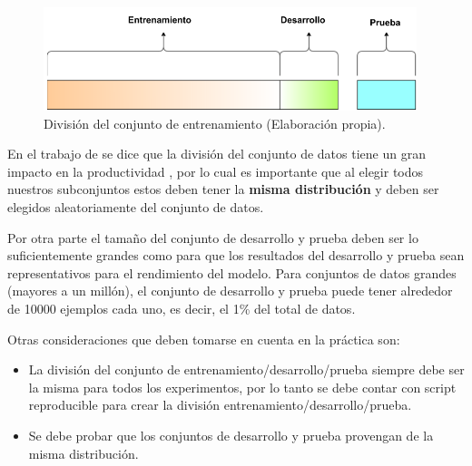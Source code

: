 \vspace{5mm} %

\begin{figure}[h!]
  \begin{center}	\includegraphics[width=0.97\textwidth,frame]{imagenes/Cap3/train-dev-test}
  \caption{Divisi\'{o}n del conjunto de entrenamiento (Elaboraci\'{o}n propia).}
  \label{fig:train-dev-test}
  \end{center}
\end{figure}

En el trabajo de  se dice que la divisi\'{o}n del conjunto de datos tiene un gran impacto en la productividad , por lo cual es importante que al elegir todos nuestros subconjuntos estos deben tener la \textbf{misma distribuci\'{o}n} y deben ser elegidos aleatoriamente del conjunto de datos. 

\vspace{5mm} %

Por otra parte el tama\~{n}o del conjunto de desarrollo y prueba deben ser lo suficientemente grandes como para que los resultados del desarrollo y prueba sean representativos para el rendimiento del modelo. Para conjuntos de datos grandes (mayores a un mill\'{o}n), el conjunto de desarrollo y prueba puede tener alrededor de 10000 ejemplos cada uno, es decir, el 1\% del total de datos.

\vspace{5mm} %

Otras consideraciones que deben tomarse en cuenta en la pr\'{a}ctica son:

\begin{itemize}
\item La divisi\'{o}n del conjunto de entrenamiento/desarrollo/prueba siempre debe ser la misma para todos los experimentos, por lo tanto se debe contar con script reproducible para crear la divisi\'{o}n entrenamiento/desarrollo/prueba.
\item Se debe probar que los conjuntos de desarrollo y prueba provengan de la misma distribuci\'{o}n.
\end{itemize}

